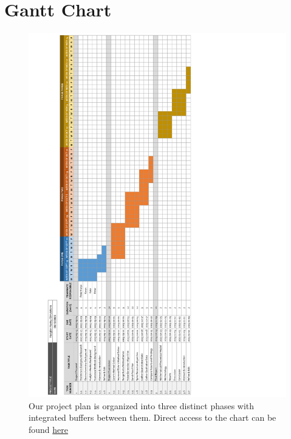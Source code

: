 \documentclass{article} %
\begin{document}
\section{Gantt Chart}
\label{app:a_gantt_chart}
\begin{figure}[htbp]
  \centering
  \includegraphics[width=0.88\linewidth]{Figs/gantt_chart_rot.png}
    \caption{Our project plan is organized into three distinct phases with integrated buffers between them.
            Direct access to the chart can be found \href{https://docs.google.com/spreadsheets/d/1jHzTcHqw4nSWZ5ZlPa9hzeYbwHf0eZ49koE-SQ0onvM/edit?usp=sharing}{here}}
\end{figure}

\newpage
\end{document}

